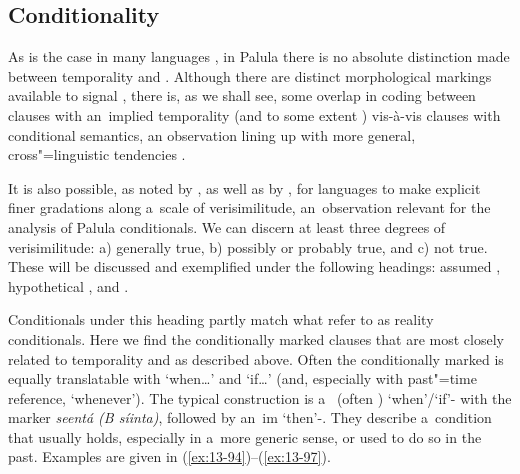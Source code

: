 
\subsection{Conditionality}
\label{subsec:13-4-4}

As is the case in many languages \citep[257--258]{thompsonetal2007}, in Palula there is no absolute distinction made between temporality and . Although there are distinct morphological markings available to signal , there is, as we shall see, some overlap in coding between clauses with an~implied temporality (and to some extent ) vis-à-vis clauses with conditional semantics, an observation lining up with more general, cross"=linguistic tendencies \citep[161]{cristofaro2005}.



It is also possible, as noted by \citet[255--260]{thompsonetal2007}, as well as by \citet[333--334]{givon2001b}, for languages to make explicit finer gradations along a~scale of verisimilitude, an~observation relevant for the analysis of Palula conditionals. We can discern at least three degrees of verisimilitude: a) generally true, b) possibly or probably true, and c) not true. These will be discussed and exemplified under the following headings: assumed , hypothetical , and .



 Conditionals under this heading partly match what \citet[255--256]{thompsonetal2007} refer to as reality conditionals. Here we find the conditionally marked clauses that are most closely related to temporality and  as described above. Often the conditionally marked  is equally translatable with `when{\ldots}' and `if{\ldots}' (and, especially with past"=time reference, `whenever'). The typical construction is a~ (often ) `when'/`if'- with the  marker \textit{seentá (B síinta)}, followed by an~im `then'-. They describe a~condition that usually holds, especially in a~more generic sense, or used to do so in the past. Examples are given in (\ref{ex:13-94})--(\ref{ex:13-97}).

